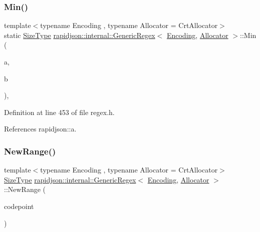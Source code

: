 \subsubsection{\texorpdfstring{Min()}{Min()}}
{\footnotesize\ttfamily template$<$typename Encoding , typename Allocator  = Crt\+Allocator$>$ \\
static \mbox{\hyperlink{namespacerapidjson_a44eb33eaa523e36d466b1ced64b85c84}{Size\+Type}} \mbox{\hyperlink{classrapidjson_1_1internal_1_1_generic_regex}{rapidjson\+::internal\+::\+Generic\+Regex}}$<$ \mbox{\hyperlink{classrapidjson_1_1_encoding}{Encoding}}, \mbox{\hyperlink{classrapidjson_1_1_allocator}{Allocator}} $>$\+::Min (\begin{DoxyParamCaption}\item[{\mbox{\hyperlink{namespacerapidjson_a44eb33eaa523e36d466b1ced64b85c84}{Size\+Type}}}]{a,  }\item[{\mbox{\hyperlink{namespacerapidjson_a44eb33eaa523e36d466b1ced64b85c84}{Size\+Type}}}]{b }\end{DoxyParamCaption})\hspace{0.3cm}{\ttfamily [static]}, {\ttfamily [private]}}



Definition at line 453 of file regex.\+h.


\begin{DoxyCode}{0}

\end{DoxyCode}


References rapidjson\+::a.

\mbox{\label{classrapidjson_1_1internal_1_1_generic_regex_a94c34701cb0a5620feedd9edc19feb0f}} 
\subsubsection{\texorpdfstring{NewRange()}{NewRange()}}
{\footnotesize\ttfamily template$<$typename Encoding , typename Allocator  = Crt\+Allocator$>$ \\
\mbox{\hyperlink{namespacerapidjson_a44eb33eaa523e36d466b1ced64b85c84}{Size\+Type}} \mbox{\hyperlink{classrapidjson_1_1internal_1_1_generic_regex}{rapidjson\+::internal\+::\+Generic\+Regex}}$<$ \mbox{\hyperlink{classrapidjson_1_1_encoding}{Encoding}}, \mbox{\hyperlink{classrapidjson_1_1_allocator}{Allocator}} $>$\+::New\+Range (\begin{DoxyParamCaption}\item[{unsigned}]{codepoint }\end{DoxyParamCaption})\hspace{0.3cm}{\ttfamily [private]}}



